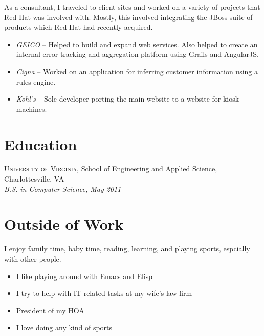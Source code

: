 \documentclass[12pt]{article}
\begin{document}
As a consultant, I traveled to client sites and worked on a variety of projects
that Red Hat was involved with. Mostly, this involved integrating the JBoss
suite of products which Red Hat had recently acquired.

\begin{itemize}
\item \textit{GEICO} -- Helped to build and expand web services. Also helped to
  create an internal error tracking and aggregation platform using Grails and
  AngularJS.

\item \textit{Cigna} -- Worked on an application for inferring customer
  information using a rules engine.

\item \textit{Kohl's} -- Sole developer porting the main website to a website
  for kiosk machines.

\end{itemize}

    
  


\section*{Education}

\textsc{University of Virginia}, School of Engineering and Applied Science,
Charlottesville, VA \\
\textit{B.S. in Computer Science, May 2011}


\section*{Outside of Work}

I enjoy family time, baby time, reading, learning, and playing sports, espcially
with other people.

\begin{itemize}
\item I like playing around with Emacs and Elisp
\item I try to help with IT-related tasks at my wife's law firm
\item President of my HOA
\item I love doing any kind of sports
\end{itemize}
\end{document}
